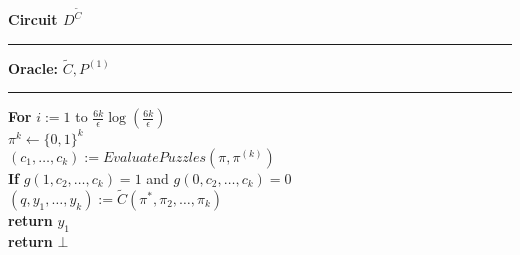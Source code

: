 \begin{codeblock}
  \textbf{Circuit $D^{\widetilde{C}}$}
  \medskip

  \hrule

  \medskip

  \textbf{Oracle:}  $\widetilde{C}, P^{(1)}$\\

  \medskip\hrule\medskip
  \textbf{For} $i:=1$ to $\frac{6k}{\epsilon} \log(\frac{6k}{\epsilon})$\\
  \IndI $\pi^{k} \leftarrow \{0,1\}^{k}$\\
  \IndI $(c_1, \dots, c_k) := EvaluatePuzzles(\pi, \pi^{(k)})$\\
  \IndI \textbf{If} $g(1,c_2, \dots, c_k) = 1$ and $g(0,c_2, \dots, c_k) = 0$\\
  \IndII $(q, y_1, \dots, y_k) := \widetilde{C}(\pi^*, \pi_2, \dots, \pi_k)$\\
  \IndII \textbf{return} $y_1$\\
  \textbf{return} $\bot$ \\

\end{codeblock}









